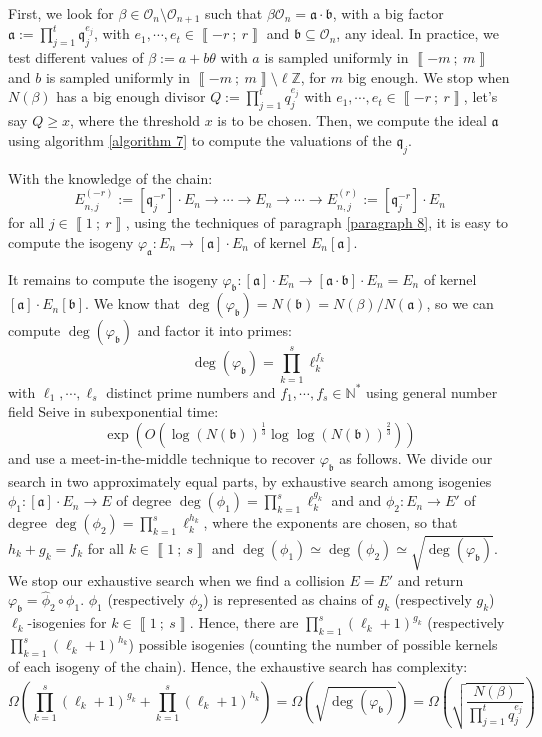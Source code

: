 \documentclass[a4paper,10pt]{report}
\theoremstyle{definition}
\theoremstyle{plain}
\theoremstyle{definition}
\newcommand{\N}{\mathbb{N}}
\newcommand{\Z}{\mathbb{Z}}
\newcommand{\mO}{\mathcal{O}}
\renewcommand{\i}[2]{\left\llbracket #1~;~#2\right\rrbracket}
\renewcommand{\(}{\left(}
\renewcommand{\)}{\right)}
\newcommand{\mf}[1]{\mathfrak{#1}}
\begin{document}
First, we look for $\beta\in\mO_n\setminus\mO_{n+1}$ such that $\beta\mO_n=\mf{a}\cdot \mf{b}$, with a big factor $\mf{a}:=\prod_{j=1}^t\mf{q}_j^{e_j}$, with $e_1, \cdots, e_t\in\i{-r}{r}$ and $\mf{b}\subseteq\mO_n$, any ideal. In practice, we test different values of $\beta:=a+b\theta$ with $a$ is sampled uniformly in $\i{-m}{m}$ and $b$ is sampled uniformly in $\i{-m}{m}\setminus\ell\Z$, for $m$ big enough. We stop when $N(\beta)$ has a big enough divisor $Q:=\prod_{j=1}^t q_j^{e_j}$ with $e_1, \cdots, e_t\in\i{-r}{r}$, let's say $Q\geq x$, where the threshold $x$ is to be chosen. Then, we compute the ideal $\mf{a}$ using algorithm \ref{algorithm 7} to compute the valuations of the $\mf{q}_j$.  

With the knowledge of the chain: 
\[E_{n,j}^{(-r)}:=[\mf{q}_j^{-r}]\cdot E_n\longrightarrow \cdots \longrightarrow E_{n}\longrightarrow \cdots\longrightarrow E_{n,j}^{(r)}:=[\mf{q}_j^{-r}]\cdot E_n\]
for all $j\in\i{1}{r}$, using the techniques of paragraph \ref{paragraph 8}, it is easy to compute the isogeny $\varphi_{\mf{a}}:E_n\longrightarrow [\mf{a}]\cdot E_n$ of kernel $E_n[\mf{a}]$. 

It remains to compute the isogeny $\varphi_{\mf{b}}:[\mf{a}]\cdot E_n\longrightarrow [\mf{a}\cdot\mf{b}]\cdot E_n=E_n$ of kernel $[\mf{a}]\cdot E_n[\mf{b}]$.  We know that $\deg(\varphi_{\mf{b}})=N(\mf{b})=N(\beta)/N(\mf{a})$, so we can compute $\deg(\varphi_{\mf{b}})$ and factor it into primes:
\[\deg(\varphi_{\mf{b}})=\prod_{k=1}^s\ell_k^{f_k}\]
with $\ell_1,\cdots, \ell_s$ distinct prime numbers and $f_1,\cdots, f_s\in\N^*$ using general number field Seive in subexponential time:
\[\exp\(O\(\log(N(\mf{b}))^{\frac{1}{3}}\log\log(N(\mf{b}))^{\frac{2}{3}}\)\)\] 
and use a meet-in-the-middle technique to recover $\varphi_{\mf{b}}$ as follows. We divide our search in two approximately equal parts, by exhaustive search among isogenies $\phi_1 : [\mf{a}]\cdot E_n\longrightarrow E$ of degree $\deg(\phi_1)=\prod_{k=1}^s\ell_k^{g_k}$ and and $\phi_2 : E_n\longrightarrow E'$ of degree $\deg(\phi_2)=\prod_{k=1}^s\ell_k^{h_k}$, where the exponents are chosen, so that $h_k+g_k=f_k$ for all $k\in\i{1}{s}$ and $\deg(\phi_1)\simeq\deg(\phi_2)\simeq\sqrt{\deg(\varphi_{\mf{b}})}$. We stop our exhaustive search when we find a collision $E=E'$ and return $\varphi_{\mf{b}}=\widehat{\phi}_2\circ\phi_1$. $\phi_1$ (respectively $\phi_2$) is represented as chains of $g_k$ (respectively $g_k$) $\ell_k$-isogenies for $k\in\i{1}{s}$. Hence, there are $\prod_{k=1}^s(\ell_k+1)^{g_k}$ (respectively $\prod_{k=1}^s(\ell_k+1)^{h_k}$) possible isogenies (counting the number of possible kernels of each isogeny of the chain). Hence, the exhaustive search has complexity:
\[\Omega\(\prod_{k=1}^s(\ell_k+1)^{g_k}+\prod_{k=1}^s(\ell_k+1)^{h_k}\)=\Omega(\sqrt{\deg(\varphi_{\mf{b}})})=\Omega\(\sqrt{\frac{N(\beta)}{\prod_{j=1}^t q_j^{e_j}}}\)\]
\end{document}
